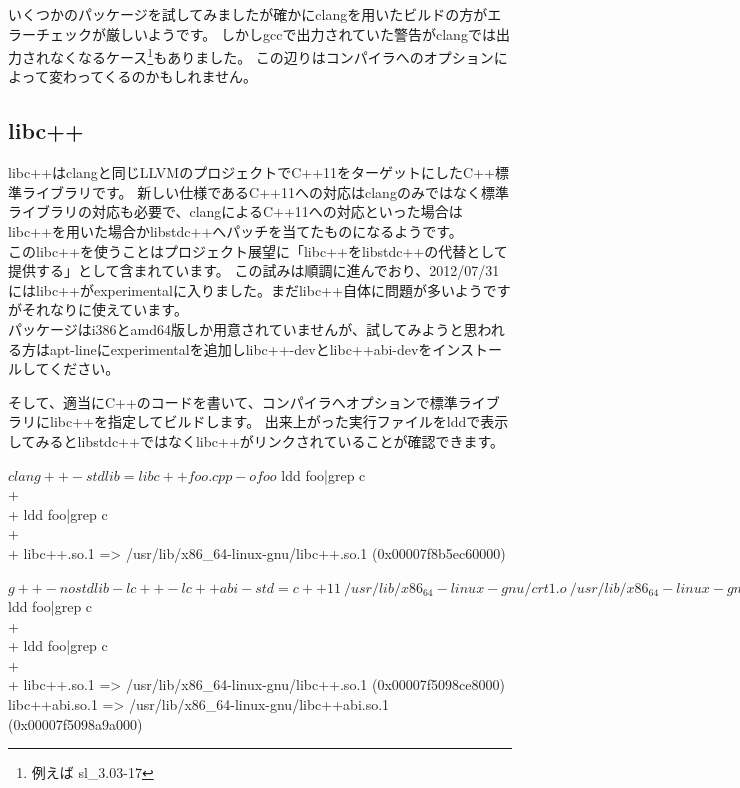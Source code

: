 \documentclass[mingoth,a4paper]{jsarticle}
\begin{document}
いくつかのパッケージを試してみましたが確かにclangを用いたビルドの方がエラーチェックが厳しいようです。
しかしgccで出力されていた警告がclangでは出力されなくなるケース\footnote{例えば sl\_3.03-17}もありました。
この辺りはコンパイラへのオプションによって変わってくるのかもしれません。


\subsection{libc++}

libc++はclangと同じLLVMのプロジェクトでC++11をターゲットにしたC++標準ライブラリです。
新しい仕様であるC++11への対応はclangのみではなく標準ライブラリの対応も必要で、clangによるC++11への対応といった場合はlibc++を用いた場合かlibstdc++へパッチを当てたものになるようです。
\\

このlibc++を使うことはプロジェクト展望に「libc++をlibstdc++の代替として提供する」\cite{altlibc++}として含まれています。
この試みは順調に進んでおり、2012/07/31にはlibc++がexperimentalに入りました。まだlibc++自体に問題が多いようですがそれなりに使えています。
\\

パッケージはi386とamd64版しか用意されていませんが、試してみようと思われる方はapt-lineにexperimentalを追加しlibc++-devとlibc++abi-devをインストールしてください。


そして、適当にC++のコードを書いて、コンパイラへオプションで標準ライブラリにlibc++を指定してビルドします。
出来上がった実行ファイルをlddで表示してみるとlibstdc++ではなくlibc++がリンクされていることが確認できます。
\cite{newc++stdlibindebian}

\begin{commandline}
$ clang++ -stdlib=libc++ foo.cpp -o foo
$ ldd foo|grep c\\+\\+
ldd foo|grep c\\+\\+
  libc++.so.1 => /usr/lib/x86_64-linux-gnu/libc++.so.1 (0x00007f8b5ec60000)
\end{commandline}

\begin{commandline}
$ g++ -nostdlib -lc++ -lc++abi -std=c++11 \
  /usr/lib/x86_64-linux-gnu/crt1.o \
  /usr/lib/x86_64-linux-gnu/crti.o \
  /usr/lib/x86_64-linux-gnu/crtn.o \
  -isystem /usr/include/c++/v1 -lc -lgcc_s \
  foo.cpp -o foo
$ ldd foo|grep c\\+\\+
ldd foo|grep c\\+\\+
  libc++.so.1 => /usr/lib/x86_64-linux-gnu/libc++.so.1 (0x00007f5098ce8000)
  libc++abi.so.1 => /usr/lib/x86_64-linux-gnu/libc++abi.so.1 (0x00007f5098a9a000)
\end{commandline}
\end{document}
